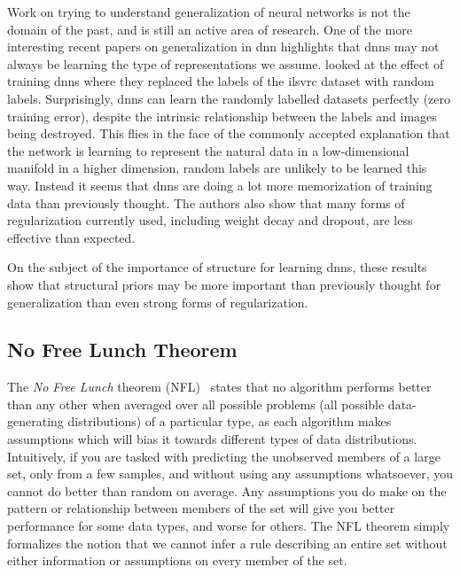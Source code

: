 \documentclass[thesis]{subfiles}
\begin{document}
	Work on trying to understand generalization of neural networks is not the domain of the past, and is still an active area of research. One of the more interesting recent papers on generalization in \gls{dnn} highlights that \glspl{dnn} may not always be learning the type of representations we assume.  looked at the effect of training \glspl{dnn} where they replaced the labels of the \gls{ilsvrc} dataset with random labels. Surprisingly, \glspl{dnn} can learn the randomly labelled datasets perfectly (\ie zero training error), despite the intrinsic relationship between the labels and images being destroyed. This flies in the face of the commonly accepted explanation that the network is learning to represent the natural data in a low-dimensional manifold in a higher dimension, random labels are unlikely to be learned this way. Instead it seems that \glspl{dnn} are doing a lot more memorization of training data than previously thought. The authors also show that many forms of regularization currently used, including weight decay and dropout, are less effective than expected.

	On the subject of the importance of structure for learning 
	\glspl{dnn}, these results show that structural priors may be more important than previously thought for generalization than even strong forms of regularization.

\subsection{No Free Lunch Theorem}
\label{nofreelunch}
The \emph{No Free Lunch} theorem (NFL)~\citep{wolpert1996lack} states that no algorithm performs better than any other when averaged over all possible problems (\ie all possible data-generating distributions) of a particular type, as each algorithm makes assumptions which will bias it towards different types of data distributions. Intuitively, if you are tasked with predicting the unobserved members of a large set, only from a few samples, and without using any assumptions whatsoever, you cannot do better than random on average. Any assumptions you do make on the pattern or relationship between members of the set will give you better performance for some data types, and worse for others. The NFL theorem simply formalizes the notion that we cannot infer a rule describing an entire set without either information or assumptions on every member of the set.
\end{document}
